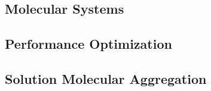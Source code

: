 \documentclass[../thesis.tex]{subfiles}
\begin{document}
\subsection{Molecular Systems}
\subsection{Performance Optimization}
\subsection{Solution Molecular Aggregation}



\end{document}
